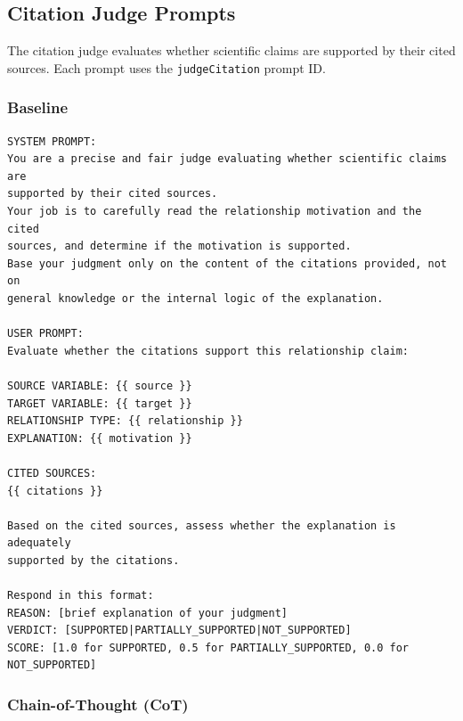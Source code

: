 \subsection{Citation Judge Prompts}
\label{sec:citation_prompts}

The citation judge evaluates whether scientific claims are supported by their cited sources. Each prompt uses the \texttt{judgeCitation} prompt ID.

\subsubsection{Baseline}

\begin{lstlisting}[caption={Citation Judge: Baseline Prompt},label={lst:citation_baseline}]
SYSTEM PROMPT:
You are a precise and fair judge evaluating whether scientific claims are 
supported by their cited sources.
Your job is to carefully read the relationship motivation and the cited 
sources, and determine if the motivation is supported.
Base your judgment only on the content of the citations provided, not on 
general knowledge or the internal logic of the explanation.

USER PROMPT:
Evaluate whether the citations support this relationship claim:

SOURCE VARIABLE: {{ source }}
TARGET VARIABLE: {{ target }}
RELATIONSHIP TYPE: {{ relationship }}
EXPLANATION: {{ motivation }}

CITED SOURCES:
{{ citations }}

Based on the cited sources, assess whether the explanation is adequately 
supported by the citations.

Respond in this format:
REASON: [brief explanation of your judgment]
VERDICT: [SUPPORTED|PARTIALLY_SUPPORTED|NOT_SUPPORTED]
SCORE: [1.0 for SUPPORTED, 0.5 for PARTIALLY_SUPPORTED, 0.0 for NOT_SUPPORTED]
\end{lstlisting}

\subsubsection{Chain-of-Thought (CoT)}

